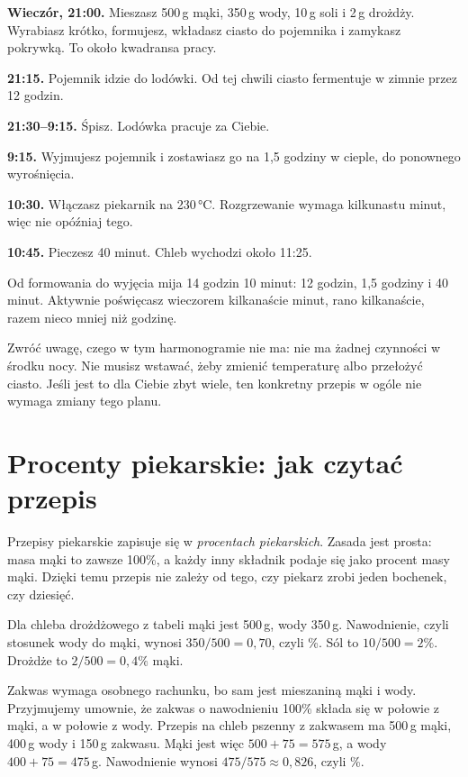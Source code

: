\begin{przyklad}
\textbf{Wieczór, 21:00.} Mieszasz 500\,g mąki, 350\,g wody, 10\,g soli i 2\,g drożdży. Wyrabiasz krótko, formujesz, wkładasz ciasto do pojemnika i zamykasz pokrywką. To około kwadransa pracy.

\textbf{21:15.} Pojemnik idzie do lodówki. Od tej chwili ciasto fermentuje w zimnie przez 12 godzin.

\textbf{21:30--9:15.} Śpisz. Lodówka pracuje za Ciebie.

\textbf{9:15.} Wyjmujesz pojemnik i zostawiasz go na 1,5 godziny w cieple, do ponownego wyrośnięcia.

\textbf{10:30.} Włączasz piekarnik na 230\,°C. Rozgrzewanie wymaga kilkunastu minut, więc nie opóźniaj tego.

\textbf{10:45.} Pieczesz 40 minut. Chleb wychodzi około 11:25.

Od formowania do wyjęcia mija 14 godzin 10 minut: 12 godzin, 1,5 godziny i 40 minut. Aktywnie poświęcasz wieczorem kilkanaście minut, rano kilkanaście, razem nieco mniej niż godzinę.
\end{przyklad}

Zwróć uwagę, czego w tym harmonogramie nie ma: nie ma żadnej czynności w środku nocy. Nie musisz wstawać, żeby zmienić temperaturę albo przełożyć ciasto. Jeśli jest to dla Ciebie zbyt wiele, ten konkretny przepis w ogóle nie wymaga zmiany tego planu.

\section{Procenty piekarskie: jak czytać przepis}

Przepisy piekarskie zapisuje się w \emph{procentach piekarskich}. Zasada jest prosta: masa mąki to zawsze 100\%, a każdy inny składnik podaje się jako procent masy mąki. Dzięki temu przepis nie zależy od tego, czy piekarz zrobi jeden bochenek, czy dziesięć.

Dla chleba drożdżowego z tabeli mąki jest 500\,g, wody 350\,g. Nawodnienie, czyli stosunek wody do mąki, wynosi $350 / 500 = 0{,}70$, czyli \%. Sól to $10 / 500 = 2\%$. Drożdże to $2 / 500 = 0{,}4\%$ mąki.

Zakwas wymaga osobnego rachunku, bo sam jest mieszaniną mąki i wody. Przyjmujemy umownie, że zakwas o nawodnieniu 100\% składa się w połowie z mąki, a w połowie z wody. Przepis na chleb pszenny z zakwasem ma 500\,g mąki, 400\,g wody i 150\,g zakwasu. Mąki jest więc $500 + 75 = 575$\,g, a wody $400 + 75 = 475$\,g. Nawodnienie wynosi $475 / 575 \approx 0{,}826$, czyli \%.

